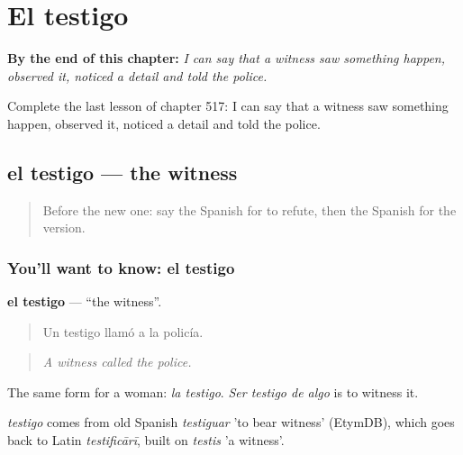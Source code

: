 
\chapter{El testigo}
\label{ch:es-el-testigo}

\begin{chapteropening}
\textbf{By the end of this chapter:} \emph{I can say that a witness saw something happen, observed it, noticed a detail and told the police.}

Complete the last lesson of chapter 517: I can say that a witness saw something happen, observed it, noticed a detail and told the police.
\end{chapteropening}

\section[el testigo]{el testigo — the witness}

\label{lesson:ES-C517-testigo}



\begin{quote}
Before the new one: say the Spanish for to refute, then the Spanish for the version.
\end{quote}

\subsection*{You'll want to know: el testigo}
\textbf{el testigo} — \textquotedblleft{}the witness\textquotedblright{}.

\begin{quote}
Un testigo llamó a la policía.
\end{quote}

\begin{quote}
\emph{A witness called the police.}
\end{quote}

The same form for a woman: \emph{la testigo}. \emph{Ser testigo de algo} is to witness it.

\begin{cousinweb}
\emph{testigo} comes from old Spanish \emph{testiguar} 'to bear witness' (EtymDB), which goes back to Latin \emph{testificārī}, built on \emph{testis} 'a witness'.
\end{cousinweb}

